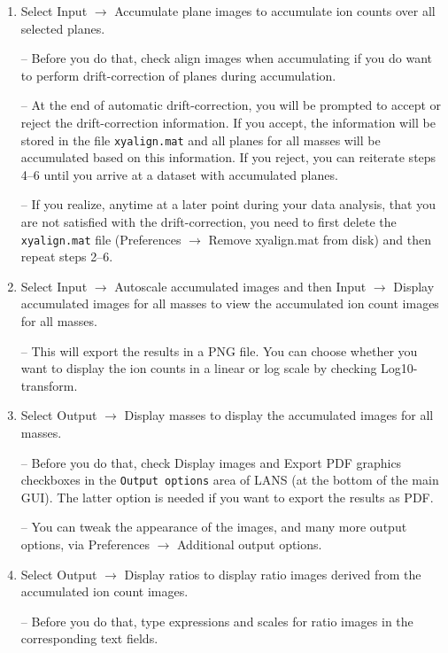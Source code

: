 \documentclass[a4paper, 11pt]{article}
\newcommand{\ttt}[1]{\texttt{#1}}
\newcommand{\lans}[1]{{\color{magenta}#1}}
\newcommand{\lanscb}[1]{{\color{darkgreen}#1}}
\newcommand{\lanstf}[1]{{\color{cyan}#1}}
\newcommand\mnote{\marginnote{\fbox{\textbf{\bf Note}}}}
\newcommand\ra{\rightarrow}
\newcommand\addon[1]{-- {\small #1}}
\begin{document}
\begin{enumerate}
\item Select \lans{Input} $\ra$ \lans{Accumulate plane images} to accumulate ion counts over all selected planes.  

\addon{Before you do that, check \lanscb{align images when accumulating} if you do want to perform drift-correction of planes during accumulation.}

\addon{At the end of automatic drift-correction, you will be prompted to accept or reject the drift-correction information. If you \lans{accept}, the information will be stored in the file \ttt{xyalign.mat} and all planes for all masses will be accumulated based on this information. If you \lans{reject}, you can reiterate steps 4--6 until you arrive at a dataset with accumulated planes.}

\mnote
\addon{If you realize, anytime at a later point during your data analysis, that you are not satisfied with the drift-correction, you need to first delete the \ttt{xyalign.mat} file (\lans{Preferences} $\ra$ \lans{Remove xyalign.mat from disk}) and then repeat steps 2--6.}

\item Select \lans{Input} $\ra$ \lans{Autoscale accumulated images} and then \lans{Input} $\ra$ \lans{Display accumulated images for all masses} to view the accumulated ion count images for all masses. 

\addon{This will export the results in a PNG file. You can choose whether you want to display the ion counts in a linear or log scale by checking \lanscb{Log10-transform}.}

\item Select \lans{Output} $\ra$ \lans{Display masses} to display the accumulated images for all masses.

\addon{Before you do that, check \lanscb{Display images} and \lanscb{Export PDF graphics} checkboxes in the \ttt{Output options} area of LANS (at the bottom of the main GUI). The latter option is needed if you want to export the results as PDF.}

\mnote
\addon{You can tweak the appearance of the images, and many more output options, via \lans{Preferences} $\ra$ \lans{Additional output options}.}

\item Select \lans{Output} $\ra$ \lans{Display ratios} to display ratio images derived from the accumulated ion count images.

\addon{Before you do that, type \lanstf{expressions} and \lanstf{scales} for ratio images in the corresponding text fields.}


\end{enumerate}
\end{document}
